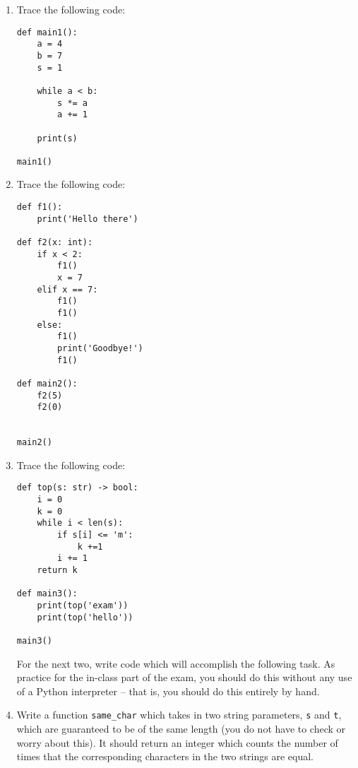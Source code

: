 \documentclass{article}
\begin{document}
\begin{enumerate}

\item Trace the following code:

\begin{verbatim}
def main1():
    a = 4
    b = 7
    s = 1

    while a < b:
        s *= a
        a += 1

    print(s)

main1()
\end{verbatim}


\item  Trace the following code:

\begin{verbatim}
def f1():
    print('Hello there')

def f2(x: int):
    if x < 2:
        f1()
        x = 7
    elif x == 7:
        f1()
        f1()
    else:
        f1()
        print('Goodbye!')
        f1()

def main2():
    f2(5)
    f2(0)


main2()
\end{verbatim}

\newpage

\item  Trace the following code:

\begin{verbatim}
def top(s: str) -> bool:
    i = 0
    k = 0
    while i < len(s):
        if s[i] <= 'm':
            k +=1
        i += 1
    return k

def main3():
    print(top('exam'))
    print(top('hello'))

main3()
\end{verbatim}

\newpage





\newpage

For the next two, write code which will accomplish the following task. As practice for the in-class part of the exam, you should do this without any use of a Python interpreter -- that is, you should do this entirely by hand.

\item Write a function \verb|same_char| which takes in two string parameters, \verb|s| and \verb|t|, which are guaranteed to be of the same length (you do not have to check or worry about this). It should return an integer which counts the number of times that the corresponding characters in the two strings are equal.


\end{enumerate}
\end{document}
